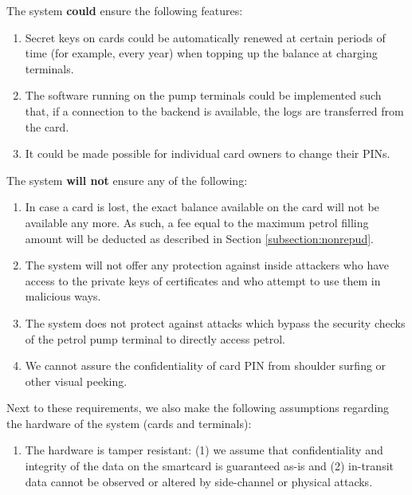 The system {\bf could} ensure the following features:
\begin{enumerate}
  \item Secret keys on cards could be automatically renewed at certain periods of time (for example, every year) when topping up the balance at charging terminals.
  \item The software running on the pump terminals could be implemented such that, if a connection to the backend is available, the logs are transferred from the card.
  \item It could be made possible for individual card owners to change their PINs.
\end{enumerate}

The system {\bf will not} ensure any of the following:
\begin{enumerate}
  \item In case a card is lost, the exact balance available on the card will not be available any more. As such, a fee equal to the maximum petrol filling amount will be deducted as described in Section \ref{subsection:nonrepud}.
  \item The system will not offer any protection against inside attackers who have access to the private keys of certificates and who attempt to use them in malicious ways.
  \item The system does not protect against attacks which bypass the security checks of the petrol pump terminal to directly access petrol.
  \item We cannot assure the confidentiality of card PIN from shoulder surfing or other visual peeking.
\end{enumerate}

Next to these requirements, we also make the following assumptions regarding the hardware of the system (cards and terminals):
\begin{enumerate}
  \item The hardware is tamper resistant: (1) we assume that confidentiality and integrity of the data on the smartcard is guaranteed as-is and (2) in-transit data cannot be observed or altered by side-channel or physical attacks.
\end{enumerate}